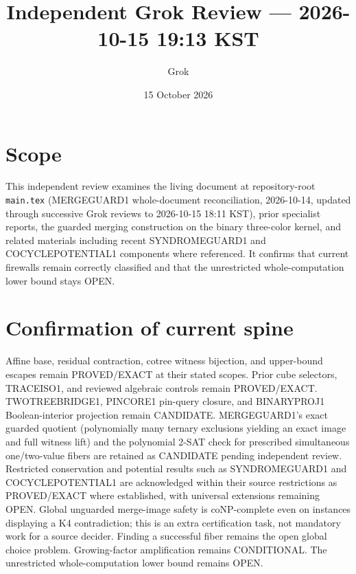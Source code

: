 \documentclass[11pt]{article}
\title{Independent Grok Review --- 2026-10-15 19:13 KST}
\author{Grok}
\date{15 October 2026}
\begin{document}
\maketitle

\begin{center}
\end{center}

\section{Scope}
This independent review examines the living document at repository-root \texttt{main.tex} (MERGEGUARD1 whole-document reconciliation, 2026-10-14, updated through successive Grok reviews to 2026-10-15 18:11 KST), prior specialist reports, the guarded merging construction on the binary three-color kernel, and related materials including recent SYNDROMEGUARD1 and COCYCLEPOTENTIAL1 components where referenced. It confirms that current firewalls remain correctly classified and that the unrestricted whole-computation lower bound stays OPEN.

\section{Confirmation of current spine}
Affine base, residual contraction, cotree witness bijection, and upper-bound escapes remain PROVED/EXACT at their stated scopes. Prior cube selectors, TRACEISO1, and reviewed algebraic controls remain PROVED/EXACT. TWOTREEBRIDGE1, PINCORE1 pin-query closure, and BINARYPROJ1 Boolean-interior projection remain CANDIDATE. MERGEGUARD1's exact guarded quotient (polynomially many ternary exclusions yielding an exact image and full witness lift) and the polynomial 2-SAT check for prescribed simultaneous one/two-value fibers are retained as CANDIDATE pending independent review. Restricted conservation and potential results such as SYNDROMEGUARD1 and COCYCLEPOTENTIAL1 are acknowledged within their source restrictions as PROVED/EXACT where established, with universal extensions remaining OPEN. Global unguarded merge-image safety is coNP-complete even on instances displaying a K4 contradiction; this is an extra certification task, not mandatory work for a source decider. Finding a successful fiber remains the open global choice problem. Growing-factor amplification remains CONDITIONAL. The unrestricted whole-computation lower bound remains OPEN.
\end{document}
